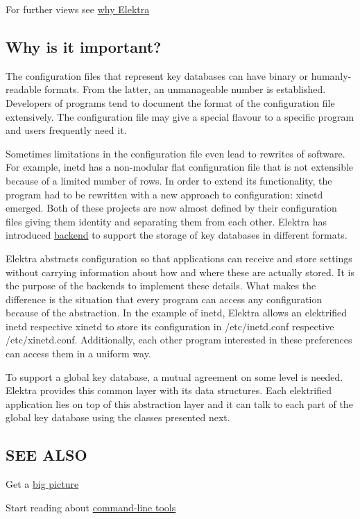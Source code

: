 For further views see \hyperlink{doc_WHY_md}{why Elektra}

\subsection*{Why is it important?}

The configuration files that represent key databases can have binary or humanly-\/readable formats. From the latter, an unmanageable number is established. Developers of programs tend to document the format of the configuration file extensively. The configuration file may give a special flavour to a specific program and users frequently need it.

Sometimes limitations in the configuration file even lead to rewrites of software. For example, inetd has a non-\/modular flat configuration file that is not extensible because of a limited number of rows. In order to extend its functionality, the program had to be rewritten with a new approach to configuration\+: xinetd emerged. Both of these projects are now almost defined by their configuration files giving them identity and separating them from each other. Elektra has introduced \hyperlink{md_doc_help_elektra-backends_doc_help_elektra-backends_md}{backend} to support the storage of key databases in different formats.

Elektra abstracts configuration so that applications can receive and store settings without carrying information about how and where these are actually stored. It is the purpose of the backends to implement these details. What makes the difference is the situation that every program can access any configuration because of the abstraction. In the example of inetd, Elektra allows an elektrified inetd respective xinetd to store its configuration in /etc/inetd.conf respective /etc/xinetd.conf. Additionally, each other program interested in these preferences can access them in a uniform way.

To support a global key database, a mutual agreement on some level is needed. Elektra provides this common layer with its data structures. Each elektrified application lies on top of this abstraction layer and it can talk to each part of the global key database using the classes presented next.

\subsection*{S\+E\+E A\+L\+S\+O}


\begin{DoxyItemize}
\item Get a \hyperlink{doc_BIGPICTURE_md}{big picture}
\item Start reading about \hyperlink{md_doc_help_kdb-introduction_doc_help_kdb-introduction_md}{command-\/line tools} 
\end{DoxyItemize}